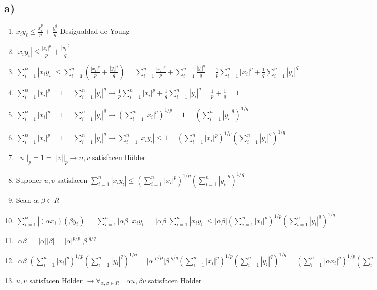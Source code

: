 \subsection*{a)}

\begin{enumerate}
  \item $x_i y_i \leq \frac{x_i^p}{p} + \frac{y_i^q}{q}$ Desigualdad de Young
  \item $|x_i y_i| \leq \frac{|x_i|^p}{p} + \frac{|y_i|^q}{q}$
  \item $\sum_{i=1}^n |x_i y_i| \leq \sum_{i=1}^n \left( \frac{|x_i|^p}{p} + \frac{|y_i|^q}{q} \right) = \sum_{i=1}^n \frac{|x_i|^p}{p} + \sum_{i=1}^n \frac{|y_i|^q}{q} = \frac{1}{p} \sum_{i=1}^n |x_i|^p + \frac{1}{q} \sum_{i=1}^n |y_i|^q$
	\item $\sum_{i=1}^n |x_i|^p = 1 = \sum_{i=1}^n |y_i|^q \to \frac{1}{p} \sum_{i=1}^n |x_i|^p + \frac{1}{q} \sum_{i=1}^n |y_i|^q = \frac{1}{p} + \frac{1}{q} = 1$
	\item $\sum_{i=1}^n |x_i|^p = 1 = \sum_{i=1}^n |y_i|^q \to \left( \sum_{i=1}^n |x_i|^p \right)^{1/p} = 1 = \left( \sum_{i=1}^n |y_i|^q \right)^{1/q}$
  \item $\sum_{i=1}^n |x_i|^p = 1 = \sum_{i=1}^n |y_i|^q \to \sum_{i=1}^n |x_i y_i| \leq 1 = \left( \sum_{i=1}^n |x_i|^p \right)^{1/p} \left( \sum_{i=1}^n |y_i|^q \right)^{1/q}$
  \item $||u||_p = 1 = ||v||_p \to u,v$ satisfacen H\"{o}lder
  \item Suponer $u,v$ satisfacen $\sum_{i=1}^n |x_i y_i| \leq \left( \sum_{i=1}^n |x_i|^p \right)^{1/p} \left( \sum_{i=1}^n |y_i|^q \right)^{1/q}$
  \item Sean $\alpha, \beta \in R$
  \item $\sum_{i=1}^n | (\alpha x_i) (\beta y_i) | = \sum_{i=1}^n  |\alpha \beta||x_i y_i| = |\alpha \beta| \sum_{i=1}^n |x_i y_i| \leq |\alpha \beta| \left( \sum_{i=1}^n |x_i|^p \right)^{1/p} \left( \sum_{i=1}^n |y_i|^q \right)^{1/q}$
  \item $|\alpha \beta| = |\alpha| |\beta| = |\alpha|^{p/p} |\beta|^{q/q}$
  \item $|\alpha \beta| \left( \sum_{i=1}^n |x_i|^p \right)^{1/p} \left( \sum_{i=1}^n |y_i|^q \right)^{1/q} = |\alpha|^{p/p} |\beta|^{q/q} \left( \sum_{i=1}^n |x_i|^p \right)^{1/p} \left( \sum_{i=1}^n |y_i|^q \right)^{1/q} = \left( \sum_{i=1}^n |\alpha x_i|^p \right)^{1/p} \left( \sum_{i=1}^n |\beta y_i|^q \right)^{1/q}$
  \item $u,v$ satisfacen H\"{o}lder $\to \forall_{\alpha, \beta \in R} \quad \alpha u, \beta v$ satisfacen H\"{o}lder 
\end{enumerate}
